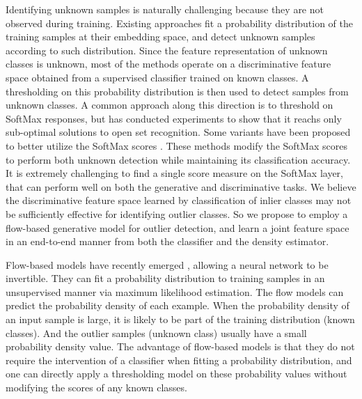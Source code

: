\documentclass[runningheads]{llncs}
\begin{document}
Identifying unknown samples is naturally challenging because they are not observed during training. 
Existing approaches fit a probability distribution of the training samples at their embedding space, and detect unknown samples according to such distribution. Since the feature representation of unknown classes is unknown, most of the methods operate on a discriminative feature space obtained from a supervised classifier trained on known classes. A thresholding on this probability distribution is then used to detect samples from unknown classes. A common approach along this direction is to threshold on SoftMax responses, but \cite{bendale2016towards} has conducted experiments to show that it reachs only sub-optimal solutions to open set recognition. Some variants have been proposed to better utilize the SoftMax scores \cite{ge2017generative,neal2018open,shu2017doc}. These methods modify the SoftMax scores to perform both unknown detection while maintaining its classification accuracy. It is extremely challenging to find a single score measure on the SoftMax layer, that can perform well on both the generative and discriminative tasks. 
We believe the discriminative feature space learned by classification of inlier classes may not be sufficiently effective for identifying outlier classes. So we propose to employ a flow-based generative model for outlier detection, and learn a joint feature space in an end-to-end manner from both the classifier and the density estimator.

Flow-based models have recently emerged \cite{behrmann2018invertible,chen2019residual,dinh2014nice,dinh2016density,kingma2018glow}, allowing a neural network to be invertible. They can fit a probability distribution to training samples in an unsupervised manner via maximum likelihood estimation. The flow models can predict the probability density of each example. When the probability density of an input sample is large, it is likely to be part of the training distribution (known classes). And the outlier samples (unknown class) usually have a small probability density value. The advantage of flow-based models is that they do not require the intervention of a classifier when fitting a probability distribution, and one can directly apply a thresholding model on these probability values without modifying the scores of any known classes. 
\end{document}
